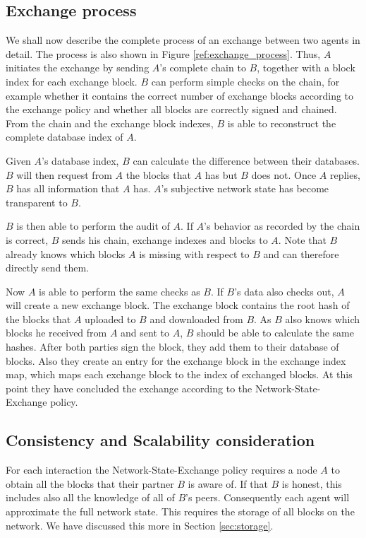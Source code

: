 \subsection{Exchange process}
We shall now describe the complete process of an exchange between two agents in detail. The process
is also shown in Figure \ref{ref:exchange_process}. Thus, $A$ 
initiates the exchange by sending $A$'s complete chain to $B$, together with a block index for each 
exchange block.
$B$ can perform simple checks on the chain, for example whether it contains the correct number of exchange blocks
according to the exchange policy and whether all blocks are correctly signed and chained. From the 
chain and the exchange block indexes, $B$ is able to reconstruct the complete database index of $A$.

Given $A$'s database index, $B$ can calculate the difference between their databases. $B$ will 
then request from $A$ the blocks that $A$ has but $B$ does not. Once $A$ replies, $B$ has all 
information that $A$ has. $A$'s subjective network state has become transparent to $B$. 

$B$ is then able to perform the audit of $A$. If $A$'s behavior as recorded by the chain is correct, 
$B$ sends his chain, exchange
indexes and blocks to $A$. Note that $B$ already knows which blocks $A$ is missing with respect to 
$B$ and can therefore directly send them. 

Now $A$ is able to perform the same checks as $B$. If $B$'s data also checks out, $A$ will create 
a new exchange block. The exchange block contains the root hash of the blocks that $A$ uploaded to $B$ 
and downloaded from $B$. As $B$ also knows which blocks he received from $A$ and sent to $A$, $B$ should
be able to calculate the same hashes. After both parties sign the block, they add them to their 
database of blocks. Also they create an entry for the exchange block in the exchange index map, which 
maps each exchange block to the index of exchanged blocks. At this point they have concluded the 
exchange according to the Network-State-Exchange policy.

\subsection{Consistency and Scalability consideration}
For each interaction the Network-State-Exchange policy requires a node $A$ to obtain all the blocks that
their partner $B$ is aware of. If that $B$ is honest, this includes also all the knowledge of all of
$B$'s peers. Consequently each agent will approximate the full network state. This requires the 
storage of all blocks on the network. We have discussed this more in Section \ref{sec:storage}.

